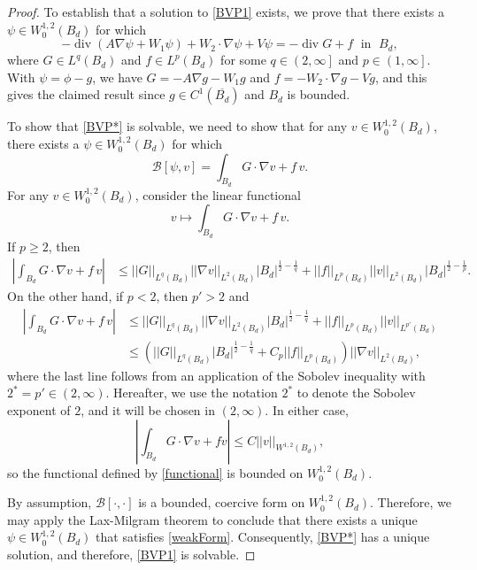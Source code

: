 \documentclass[12pt,reqno]{amsart}
\theoremstyle{plain}
\theoremstyle{definition}
\DeclareMathOperator{\di}{div}
\newcommand{\iny}{\infty}
\newcommand{\gr}{\nabla}
\newcommand{\norm}[1]{\left\vert \left\vert #1\right\vert\right\vert}
\newcommand{\abs}[1]{\left\vert#1\right\vert}
\newcommand{\brac}[1]{\left[#1\right]}
\newcommand{\pr}[1]{\left( #1 \right) }
\newcommand{\pb}[1]{\left( #1 \right] }
\begin{document}
\begin{proof}
To establish that a solution to \eqref{BVP1} exists, we prove that there exists a $\psi \in W^{1,2}_0\pr{B_d}$ for which
\begin{equation}
- \di \pr{A \gr \psi + W_1 \psi} + W_2 \cdot \gr \psi+ V \psi  = -\di G + f \;\text{ in }\; B_d,
\label{BVP*}
\end{equation}
where $G \in L^{q}\pr{B_d}$ and $f \in L^p\pr{B_d}$ for some $q \in \pb{2, \iny}$ and $p \in \pb{1, \iny}$.
With $\psi = \phi - g$, we have $G = -A \gr g - W_1 g$ and $f = - W_2 \cdot \gr g - V g$, and this gives the claimed result since $g \in C^1\pr{\overline{B_d}}$ and $B_d$ is bounded.

To show that \eqref{BVP*} is solvable, we need to show that for any $v \in W^{1,2}_0\pr{B_d}$, there exists a $\psi \in W^{1,2}_0\pr{B_d}$ for which
\begin{equation}
\mathcal B\brac{\psi, v} = \int_{B_d} G \cdot \gr v + f \, v.
\label{weakForm}
\end{equation}
For any $v \in W^{1,2}_0\pr{B_d}$, consider the linear functional
\begin{equation}
v \mapsto \int_{B_d} G \cdot \gr v + f \, v.
\label{functional}
\end{equation}
If $p \ge 2$, then
\begin{align*}
|\int_{B_d} G \cdot \gr v + f \, v|
&\le \norm{G}_{L^{q}\pr{B_d}} \norm{\gr v}_{L^2\pr{B_d}} \abs{B_d}^{\frac 1 2 - \frac 1 {q}} + \norm{f}_{L^p\pr{B_d}} \norm{v}_{L^{2}\pr{B_d}} \abs{B_d}^{\frac 1 2 - \frac 1 p} .
\end{align*}
On the other hand, if $p < 2$, then $p' > 2$ and
\begin{align*}
|\int_{B_d} G \cdot \gr v + f \, v|
&\le \norm{G}_{L^{q}\pr{B_d}} \norm{\gr v}_{L^2\pr{B_d}} \abs{B_d}^{\frac 1 2 - \frac 1 {q}} + \norm{f}_{L^p\pr{B_d}} \norm{v}_{L^{p'}\pr{B_d}} \\
&\le \pr{\norm{G}_{L^{q}\pr{B_d}} \abs{B_d}^{\frac 1 2 - \frac 1 {q}} 
+ C_p \norm{f}_{L^p\pr{B_d}}} \norm{\gr v}_{L^{2}\pr{B_d}},
\end{align*}
where the last line follows from an application of the Sobolev inequality with $2^* = p' \in \pr{2, \iny}$. 
Hereafter, we use the notation $2^*$ to denote the Sobolev exponent of $2$, and it will be chosen in $\pr{2, \iny}$.
In either case, 
$$|\int_{B_d} G \cdot \gr v + f v| \le C \norm{v}_{W^{1,2}\pr{B_d}},$$
so the functional defined by \eqref{functional} is bounded on $W^{1,2}_0\pr{B_d}$.

By assumption, $\mathcal B\brac{\cdot, \cdot}$ is a bounded, coercive form on $W^{1,2}_0\pr{B_d}$.
Therefore, we may apply the Lax-Milgram theorem to conclude that there exists a unique $\psi \in W^{1,2}_0\pr{B_d}$ that satisfies \eqref{weakForm}.
Consequently, \eqref{BVP*} has a unique solution, and therefore, \eqref{BVP1} is solvable.
\end{proof}
\end{document}
